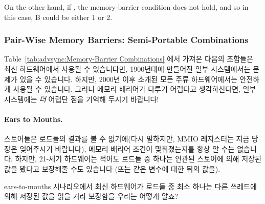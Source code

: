 	On the other hand, if , the memory-barrier condition
	does not hold, and so in this case, B could be either 1 or 2.
	\fi

\subsubsection{Pair-Wise Memory Barriers: Semi-Portable Combinations}

Table~\ref{tab:advsync:Memory-Barrier Combinations} 에서 가져온 다음의 조합들은
최신 하드웨어에서 사용될 수 있습니다만, 1900년대에 만들어진 일부 시스템에서는
문제가 있을 수 있습니다.
하지만, 2000년 이후 소개된 모든 주류 하드웨어에서는 안전하게 사용될 수
있습니다.
그러니 메모리 배리어가 다루기 어렵다고 생각하신다면, 일부 시스템에는 \emph{더}
어렵단 점을 기억해 두시기 바랍니다!

\paragraph{Ears to Mouths.}
	스토어들은 로드들의 결과를 볼 수 없기에(다시 말하지만, MMIO 레지스터는
	지금 당장은 잊어주시기 바랍니다), 메모리 배리어 조건이 맞춰졌는지를
	항상 알 수는 없습니다.
	하지만, 21-세기 하드웨어는 적어도 로드들 중 하나는 연관된 스토어에 의해
	저장된 값을 봤다고 보장해줄 수도 있습니다 (또는 같은 변수에 대한 뒤의
	값을).

\QuickQuiz{}
	ears-to-mouths 시나리오에서 최신 하드웨어가 로드들 중 최소 하나는 다른
	쓰레드에 의해 저장된 값을 읽을 거라 보장함을 우리는 어떻게 알죠?
	\iffalse

